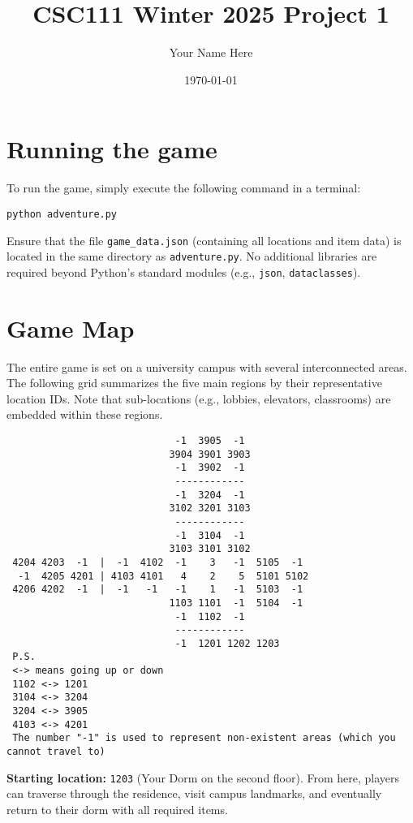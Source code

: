 \documentclass[11pt]{article}
\title{CSC111 Winter 2025 Project 1}
\author{Your Name Here}
\date{\today}
\begin{document}
\maketitle

\section*{Running the game}
To run the game, simply execute the following command in a terminal:
\begin{verbatim}
python adventure.py
\end{verbatim}
Ensure that the file \texttt{game\_data.json} (containing all locations and item data) is located in the same directory as \texttt{adventure.py}. No additional libraries are required beyond Python’s standard modules (e.g., \texttt{json}, \texttt{dataclasses}).

\section*{Game Map}
The entire game is set on a university campus with several interconnected areas. The following grid summarizes the five main regions by their representative location IDs. Note that sub-locations (e.g., lobbies, elevators, classrooms) are embedded within these regions.
\begin{verbatim}
                             -1  3905  -1
                            3904 3901 3903
                             -1  3902  -1
                             ------------
                             -1  3204  -1
                            3102 3201 3103
                             ------------
                             -1  3104  -1
                            3103 3101 3102
 4204 4203  -1  |  -1  4102  -1    3   -1  5105  -1
  -1  4205 4201 | 4103 4101   4    2    5  5101 5102
 4206 4202  -1  |  -1   -1   -1    1   -1  5103  -1
                            1103 1101  -1  5104  -1
                             -1  1102  -1
                             ------------
                             -1  1201 1202 1203
 P.S.
 <-> means going up or down
 1102 <-> 1201
 3104 <-> 3204
 3204 <-> 3905
 4103 <-> 4201
 The number "-1" is used to represent non-existent areas (which you cannot travel to)
\end{verbatim}

\textbf{Starting location:} \texttt{1203} (Your Dorm on the second floor). From here, players can traverse through the residence, visit campus landmarks, and eventually return to their dorm with all required items.
\end{document}
